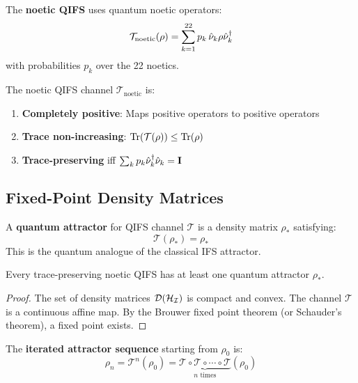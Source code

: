 \begin{definition}
\label{def:noetic-qifs}
The \textbf{noetic QIFS} uses quantum noetic operators:
\[
\mathcal{T}_{\mathrm{noetic}}(\rho) = \sum_{k=1}^{22} p_k \, \hat{\nu}_k \rho \hat{\nu}_k^\dagger
\]
with probabilities $p_k$ over the 22 noetics.
\end{definition}

\begin{theorem}
\label{thm:qifs-channel}
The noetic QIFS channel $\mathcal{T}_{\mathrm{noetic}}$ is:
\begin{enumerate}
  \item \textbf{Completely positive}: Maps positive operators to positive operators
  \item \textbf{Trace non-increasing}: $\mathrm{Tr}(\mathcal{T}(\rho)) \leq \mathrm{Tr}(\rho)$
  \item \textbf{Trace-preserving} iff $\sum_k p_k \hat{\nu}_k^\dagger \hat{\nu}_k = \mathbf{I}$
\end{enumerate}
\end{theorem}

\subsection{Fixed-Point Density Matrices}

\begin{definition}
\label{def:quantum-attractor}
A \textbf{quantum attractor} for QIFS channel $\mathcal{T}$ is a density matrix $\rho_*$ satisfying:
\[
\mathcal{T}(\rho_*) = \rho_*
\]
This is the quantum analogue of the classical IFS attractor.
\end{definition}

\begin{theorem}
\label{thm:quantum-attractor-existence}
Every trace-preserving noetic QIFS has at least one quantum attractor $\rho_*$.
\end{theorem}

\begin{proof}
The set of density matrices $\mathcal{D}(\mathcal{H}_{\mathcal{I}})$ is compact and convex. The channel $\mathcal{T}$ is a continuous affine map. By the Brouwer fixed point theorem (or Schauder's theorem), a fixed point exists.
\end{proof}

\begin{definition}
\label{def:attractor-convergence}
The \textbf{iterated attractor sequence} starting from $\rho_0$ is:
\[
\rho_n = \mathcal{T}^n(\rho_0) = \underbrace{\mathcal{T} \circ \mathcal{T} \circ \cdots \circ \mathcal{T}}_{n \text{ times}}(\rho_0)
\]
\end{definition}

